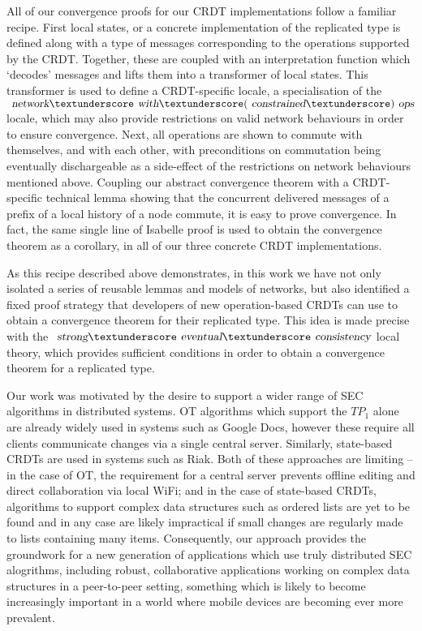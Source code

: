 \documentclass[acmlarge,review,anonymous]{acmart}\settopmatter{printfolios=true}
\begin{document}
All of our convergence proofs for our CRDT implementations follow a familiar recipe.
First local states, or a concrete implementation of the replicated type is defined along with a type of messages corresponding to the operations supported by the CRDT.
Together, these are coupled with an interpretation function which `decodes' messages and lifts them into a transformer of local states.
This transformer is used to define a CRDT-specific locale, a specialisation of the $\isa{network}{\isacharunderscore}\isa{with}{\isacharunderscore}(\isa{constrained}{\isacharunderscore})\isa{ops}$ locale, which may also provide restrictions on valid network behaviours in order to ensure convergence.
Next, all operations are shown to commute with themselves, and with each other, with preconditions on commutation being eventually dischargeable as a side-effect of the restrictions on network behaviours mentioned above.
Coupling our abstract convergence theorem with a CRDT-specific technical lemma showing that the concurrent delivered messages of a prefix of a local history of a node commute, it is easy to prove convergence.
In fact, the same single line of Isabelle proof is used to obtain the convergence theorem as a corollary, in all of our three concrete CRDT implementations.

As this recipe described above demonstrates, in this work we have not only isolated a series of reusable lemmas and models of networks, but also identified a fixed proof strategy that developers of new operation-based CRDTs can use to obtain a convergence theorem for their replicated type.
This idea is made precise with the $\isa{strong}{\isacharunderscore}\isa{eventual}{\isacharunderscore}\isa{consistency}$ local theory, which provides sufficient conditions in order to obtain a convergence theorem for a replicated type.

Our work was motivated by the desire to support a wider range of SEC algorithms in distributed systems.
OT algorithms which support the $\mathit{TP}_1$ alone are already widely used in systems such as Google Docs, however these require all clients communicate changes via a single central server.
Similarly, state-based CRDTs are used in systems such as Riak. Both of these approaches are limiting -- in the case of OT, the requirement for a central server prevents offline editing and direct collaboration via local WiFi; and in the case of state-based CRDTs, algorithms to support complex data structures such as ordered lists are yet to be found and in any case are likely impractical if small changes are regularly made to lists containing many items.
Consequently, our approach provides the groundwork for a new generation of applications which use truly distributed SEC alogrithms, including robust, collaborative applications working on complex data structures in a peer-to-peer setting, something which is likely to become increasingly important in a world where mobile devices are becoming ever more prevalent.
\end{document}
